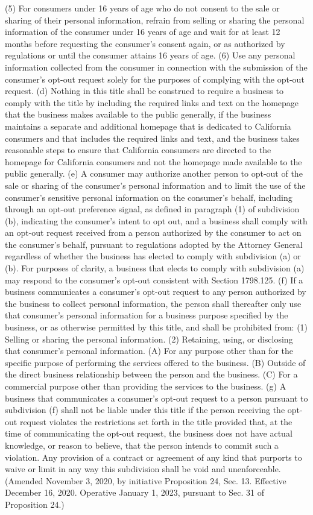 (5) For consumers under 16 years of age who do not consent to the sale or sharing of their personal information, refrain from selling or sharing the personal information of the consumer under 16 years of age and wait for at least 12 months before requesting the consumer’s consent again, or as authorized by regulations or until the consumer attains 16 years of age.
(6) Use any personal information collected from the consumer in connection with the submission of the consumer’s opt-out request solely for the purposes of complying with the opt-out request.
(d) Nothing in this title shall be construed to require a business to comply with the title by including the required links and text on the homepage that the business makes available to the public generally, if the business maintains a separate and additional homepage that is dedicated to California consumers and that includes the required links and text, and the business takes reasonable steps to ensure that California consumers are directed to the homepage for California consumers and not the homepage made available to the public generally.
(e) A consumer may authorize another person to opt-out of the sale or sharing of the consumer’s personal information and to limit the use of the consumer’s sensitive personal information on the consumer’s behalf, including through an opt-out preference signal, as defined in paragraph (1) of subdivision (b), indicating the consumer’s intent to opt out, and a business shall comply with an opt-out request received from a person authorized by the consumer to act on the consumer’s behalf, pursuant to regulations adopted by the Attorney General regardless of whether the business has elected to comply with subdivision (a) or (b). For purposes of clarity, a business that elects to comply with subdivision (a) may respond to the consumer’s opt-out consistent with Section 1798.125.
(f) If a business communicates a consumer’s opt-out request to any person authorized by the business to collect personal information, the person shall thereafter only use that consumer’s personal information for a business purpose specified by the business, or as otherwise permitted by this title, and shall be prohibited from:
(1) Selling or sharing the personal information.
(2) Retaining, using, or disclosing that consumer’s personal information.
(A) For any purpose other than for the specific purpose of performing the services offered to the business.
(B) Outside of the direct business relationship between the person and the business.
(C) For a commercial purpose other than providing the services to the business.
(g) A business that communicates a consumer’s opt-out request to a person pursuant to subdivision (f) shall not be liable under this title if the person receiving the opt-out request violates the restrictions set forth in the title provided that, at the time of communicating the opt-out request, the business does not have actual knowledge, or reason to believe, that the person intends to commit such a violation. Any provision of a contract or agreement of any kind that purports to waive or limit in any way this subdivision shall be void and unenforceable.
(Amended November 3, 2020, by initiative Proposition 24, Sec. 13. Effective December 16, 2020. Operative January 1, 2023, pursuant to Sec. 31 of Proposition 24.)

